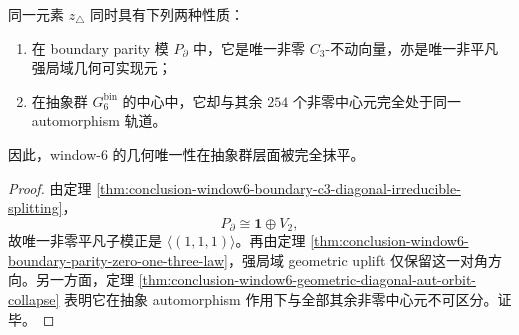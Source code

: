 \begin{corollary}\label{cor:conclusion-window6-geometric-uniqueness-erased-by-255-orbit}
同一元素 \(z_{\triangle}\) 同时具有下列两种性质：
\begin{enumerate}
  \item 在 boundary parity 模 \(P_{\partial}\) 中，它是唯一非零 \(C_3\)-不动向量，亦是唯一非平凡强局域几何可实现元；
  \item 在抽象群 \(G_6^{\mathrm{bin}}\) 的中心中，它却与其余 \(254\) 个非零中心元完全处于同一 automorphism 轨道。
\end{enumerate}
因此，window-\(6\) 的几何唯一性在抽象群层面被完全抹平。
\end{corollary}
\begin{proof}
由定理 \ref{thm:conclusion-window6-boundary-c3-diagonal-irreducible-splitting}，
\[
P_{\partial}\cong \mathbf 1\oplus V_2,
\]
故唯一非零平凡子模正是 \(\langle(1,1,1)\rangle\)。再由定理 \ref{thm:conclusion-window6-boundary-parity-zero-one-three-law}，强局域 geometric uplift 仅保留这一对角方向。另一方面，定理 \ref{thm:conclusion-window6-geometric-diagonal-aut-orbit-collapse} 表明它在抽象 automorphism 作用下与全部其余非零中心元不可区分。证毕。
\end{proof}
